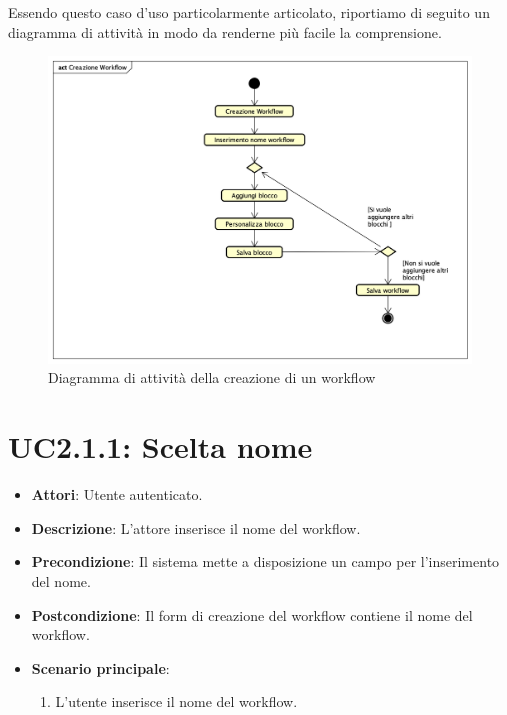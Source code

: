 Essendo questo caso d'uso particolarmente articolato, riportiamo di seguito un diagramma di attività in modo da renderne più facile la comprensione.
\begin{figure} 
	\centering
	\includegraphics[scale=0.4]{./Diagram/CreazioneWorkflow.png}
	\caption{Diagramma di attività della creazione di un workflow}\label{}
\end{figure}



\section{UC2.1.1: Scelta nome}
\label{UC2.1.1}

\begin{itemize}
	\item \textbf{Attori}: Utente autenticato.
	\item \textbf{Descrizione}: L'attore inserisce il nome del workflow.
	\item \textbf{Precondizione}: Il sistema mette a disposizione un campo per l'inserimento del nome.
	\item \textbf{Postcondizione}: Il form di creazione del workflow contiene il nome del workflow.
	\item \textbf{Scenario principale}:
	\begin{enumerate} \item L'utente inserisce il nome del workflow.\end{enumerate}
\end{itemize}

